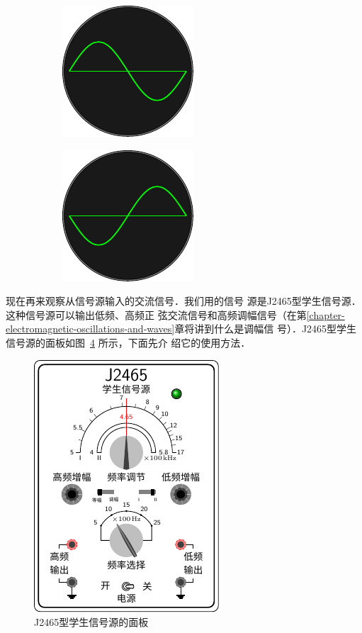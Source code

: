 \begin{figure}[htbp]
    \centering
    \begin{subfigure}{0.4\linewidth}
        \centering
        \includegraphics{fig/C/10-2a.pdf}
        \caption{}\label{fig_C_10-2a}
    \end{subfigure}
    \hfil
    \begin{subfigure}{0.4\linewidth}
        \centering
        \includegraphics{fig/C/10-2b.pdf}
        \caption{}\label{fig_C_10-2b}
    \end{subfigure}
    \caption{}\label{fig_C_10-2}
\end{figure}



现在再来观察从信号源输入的交流信号．我们用的信号
源是J2465型学生信号源．
这种信号源可以输出低频、高频正
弦交流信号和高频调幅信号（在第\ref{chapter-electromagnetic-oscillations-and-waves}章将讲到什么是调幅信
号）．J2465型学生信号源的面板如图~\ref{fig_C_10-3} 所示，下面先介
绍它的使用方法．

\begin{figure}[htbp]
	\centering
	\includegraphics{fig/C/10-3.pdf}
	\caption{J2465型学生信号源的面板}\label{fig_C_10-3}
\end{figure}



